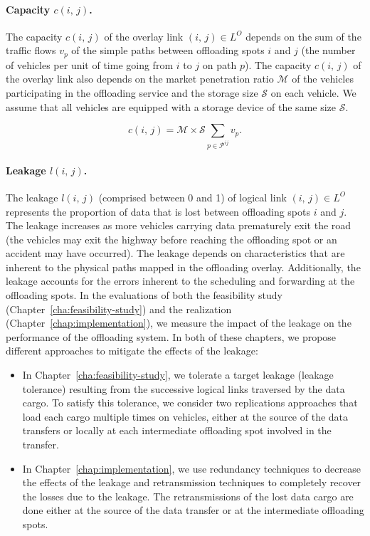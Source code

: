 \paragraph{Capacity $c(i,\,j)$.}
The capacity $c(i,\,j)$ of the overlay link $(i,\,j)\in L^{O}$ depends on the sum of the traffic flows $v_{p}$ of the simple paths between offloading spots $i$ and $j$ (\ie the number of vehicles per unit of time going from $i$ to $j$ on path $p$). The capacity $c(i,\,j)$ of the overlay link also depends on the market penetration ratio $\mathcal{M}$ of the vehicles participating in the offloading service and the storage size $\mathcal{S}$ on each vehicle. We assume that all vehicles are equipped with a storage device of the same size $\mathcal{S}$.

\begin{equation}
  c(i,\,j) = \mathcal{M} \times \mathcal{S} \sum_{p\in \mathcal{P}^{ij}} v_{p}.
\end{equation}


\paragraph{Leakage $l(i,\,j)$.}
The leakage $l(i,\,j)$ (comprised between 0 and 1) of logical link $(i,\,j)\in L^{O}$ represents the proportion of data that is lost between offloading spots $i$ and $j$. The leakage increases as more vehicles carrying data prematurely exit the road (\eg the vehicles may exit the highway before reaching the offloading spot or an accident may have occurred). The leakage depends on characteristics that are inherent to the physical paths mapped in the offloading overlay. Additionally, the leakage accounts for the errors inherent to the scheduling and forwarding at the offloading spots. In the evaluations of both the feasibility study (Chapter~\ref{cha:feasibility-study}) and the realization (Chapter~\ref{chap:implementation}), we measure the impact of the leakage on the performance of the offloading system. In both of these chapters, we propose different approaches to mitigate the effects of the leakage:
\begin{itemize}
    
    \item In Chapter~\ref{cha:feasibility-study}, we tolerate a target leakage (leakage tolerance) resulting from the successive logical links traversed by the data cargo. To satisfy this tolerance, we consider two replications approaches that load each cargo multiple times on vehicles, either at the source of the data transfers or locally at each intermediate offloading spot involved in the transfer.
    
    \item In Chapter~\ref{chap:implementation}, we use redundancy techniques to decrease the effects of the leakage and retransmission techniques to completely recover the losses due to the leakage. The retransmissions of the lost data cargo are done either at the source of the data transfer or at the intermediate offloading spots.

\end{itemize}

